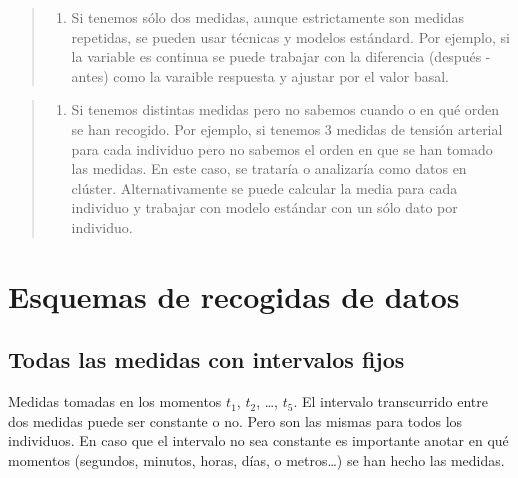 \documentclass[
]{book}
\providecommand{\tightlist}{%
  \setlength{\itemsep}{0pt}\setlength{\parskip}{0pt}}
\begin{document}
\begin{quote}
\begin{enumerate}
\def\labelenumi{\arabic{enumi}.}
\setcounter{enumi}{2}
\tightlist
\item
  Si tenemos sólo dos medidas, aunque estrictamente son medidas repetidas, se pueden usar técnicas y modelos estándard. Por ejemplo, si la variable es continua se puede trabajar con la diferencia (después - antes) como la varaible respuesta y ajustar por el valor basal.
\end{enumerate}
\end{quote}

\begin{quote}
\begin{enumerate}
\def\labelenumi{\arabic{enumi}.}
\setcounter{enumi}{3}
\tightlist
\item
  Si tenemos distintas medidas pero no sabemos cuando o en qué orden se han recogido. Por ejemplo, si tenemos 3 medidas de tensión arterial para cada individuo pero no sabemos el orden en que se han tomado las medidas. En este caso, se trataría o analizaría como datos en clúster. Alternativamente se puede calcular la media para cada individuo y trabajar con modelo estándar con un sólo dato por individuo.
\end{enumerate}
\end{quote}

\hypertarget{esquemas-de-recogidas-de-datos}{%
\section{Esquemas de recogidas de datos}\label{esquemas-de-recogidas-de-datos}}

\hypertarget{todas-las-medidas-con-intervalos-fijos}{%
\subsection{Todas las medidas con intervalos fijos}\label{todas-las-medidas-con-intervalos-fijos}}

Medidas tomadas en los momentos \(t_1\), \(t_2\), \ldots, \(t_5\). El intervalo transcurrido entre dos medidas puede ser constante o no. Pero son las mismas para todos los individuos. En caso que el intervalo no sea constante es importante anotar en qué momentos (segundos, minutos, horas, días, o metros\ldots) se han hecho las medidas.
\end{document}

